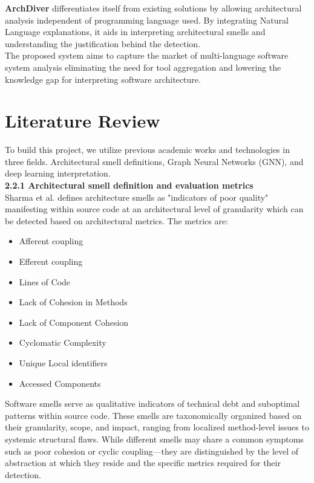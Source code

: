 \textbf{ArchDiver} differentiates itself from existing solutions by allowing architectural analysis
independent of programming language used. By integrating Natural Language explanations, it aids in 
interpreting architectural smells and understanding the justification behind the detection.
\\

The proposed system aims to capture the market of multi-language software system analysis
eliminating the need for tool aggregation and lowering the knowledge gap for interpreting software architecture.

\section{Literature Review}
\label{section:literature-review}

To build this project, we utilize previous academic works and technologies in three fields.
Architectural smell definitions, Graph Neural Networks (GNN), and deep learning interpretation.
\\

\textbf{2.2.1 Architectural smell definition and evaluation metrics}
\\

Sharma et al. \cite{Sharma2020} defines architecture smells as "indicators of poor quality"
manifesting within source code at an architectural level of granularity 
which can be detected based on architectural metrics. The metrics are:
\begin{itemize}
  \item Afferent coupling
  \item Efferent coupling
  \item Lines of Code
  \item Lack of Cohesion in Methods
  \item Lack of Component Cohesion
  \item Cyclomatic Complexity
  \item Unique Local identifiers
  \item Accessed Components
\end{itemize}

Software smells serve as qualitative indicators of technical debt and suboptimal patterns within source code. 
These smells are taxonomically organized based on their granularity, scope, and impact, ranging from localized method-level issues to systemic structural flaws.
While different smells may share a common symptoms such as poor cohesion or cyclic coupling—they are distinguished by the level of abstraction at which they reside and the specific metrics required for their detection.

